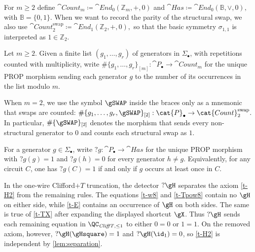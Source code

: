 \begin{definition}\label{def:count-has}
For \(m\ge 2\) define
\(
  \cat{Count}_{m}\coloneqq \cat{End}_{0}(\mathbb{Z}_m,+,0)
\)
and
\(
  \cat{Has}\coloneqq \cat{End}_{0}(\mathbb{B},\vee,0),
\)
with \(\mathbb{B}=\{0,1\}\).
When we want to record the parity of the structural swap, we also use
\(
  \cat{Count}^{\mathrm{swap}}_{2}\coloneqq \cat{End}_{1}(\mathbb{Z}_2,+,0),
\)
so that the basic symmetry \(\sigma_{1,1}\) is interpreted as \(1\in\mathbb{Z}_2\).
\end{definition}

\begin{definition}\label{def:counting-notation}
Let \(m\ge 2\).  Given a finite list \((g_1,\ldots,g_r)\) of generators in \(\Sigma_\bullet\), with
repetitions counted with multiplicity, write
\(
  \#\{g_1,\ldots,g_r\}_{[m]}:\cat{P}_\bullet\to\cat{Count}_m
\)
for the unique PROP morphism sending each generator \(g\) to the number of its occurrences in the
list modulo \(m\).
\end{definition}

When \(m=2\), we use the symbol \(\gSWAP\) inside the braces only as a mnemonic that swaps are counted:
\(
  \#\{g_1,\ldots,g_r,\gSWAP\}_{[2]}:\cat{P}_\bullet\to\cat{Count}^{\mathrm{swap}}_2.
\)
In particular, \(\#\{\gSWAP\}_{[2]}\) denotes the morphism that sends every non-structural generator
to \(0\) and counts each structural swap as \(1\).

\begin{definition}\label{def:has-functors}
For a generator \(g\in\Sigma_\bullet\), write
\(
  ?g:\cat{P}_\bullet\to\cat{Has}
\)
for the unique PROP morphism with \(?g(g)=1\) and \(?g(h)=0\) for every generator \(h\neq g\).
Equivalently, for any circuit \(C\), one has \(?g(C)=1\) if and only if \(g\) occurs at least once in
\(C\).
\end{definition}

\begin{example}\label{ex:clifford-t-h2-separator}
In the one-wire Clifford\(+T\) truncation, the detector \(?\gH\) separates the axiom
\eqref{t-H2} from the remaining rules.  The equations \eqref{t-w8} and \eqref{t-Tpow8} contain no
\(\gH\) on either side, while \eqref{t-E} contains an occurrence of \(\gH\) on both sides.  The same is
true of \eqref{t-TX} after expanding the displayed shortcut \(\gX\).  Thus \(?\gH\) sends each
remaining equation in \(\QC_{\mathit{CliffT},\le 1}\) to either \(0=0\) or \(1=1\).  On the removed axiom,
however, \(?\gH(\gHsquare)=1\) and \(?\gH(\id_1)=0\), so \eqref{t-H2} is independent by
\cref{lem:separation}.
\end{example}

